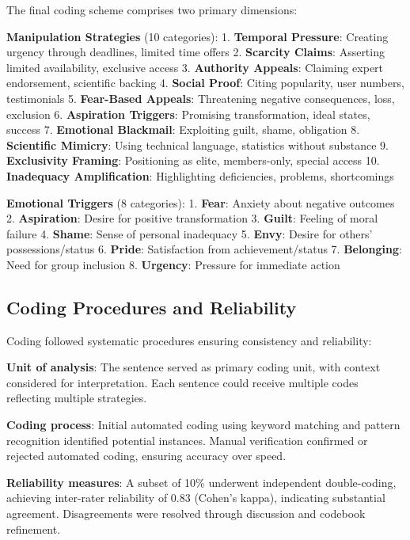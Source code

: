 The final coding scheme comprises two primary dimensions:

\textbf{Manipulation Strategies} (10 categories):
1. \textbf{Temporal Pressure}: Creating urgency through deadlines, limited time offers
2. \textbf{Scarcity Claims}: Asserting limited availability, exclusive access
3. \textbf{Authority Appeals}: Claiming expert endorsement, scientific backing
4. \textbf{Social Proof}: Citing popularity, user numbers, testimonials
5. \textbf{Fear-Based Appeals}: Threatening negative consequences, loss, exclusion
6. \textbf{Aspiration Triggers}: Promising transformation, ideal states, success
7. \textbf{Emotional Blackmail}: Exploiting guilt, shame, obligation
8. \textbf{Scientific Mimicry}: Using technical language, statistics without substance
9. \textbf{Exclusivity Framing}: Positioning as elite, members-only, special access
10. \textbf{Inadequacy Amplification}: Highlighting deficiencies, problems, shortcomings

\textbf{Emotional Triggers} (8 categories):
1. \textbf{Fear}: Anxiety about negative outcomes
2. \textbf{Aspiration}: Desire for positive transformation
3. \textbf{Guilt}: Feeling of moral failure
4. \textbf{Shame}: Sense of personal inadequacy
5. \textbf{Envy}: Desire for others' possessions/status
6. \textbf{Pride}: Satisfaction from achievement/status
7. \textbf{Belonging}: Need for group inclusion
8. \textbf{Urgency}: Pressure for immediate action

\subsection{Coding Procedures and Reliability}

Coding followed systematic procedures ensuring consistency and reliability:

\textbf{Unit of analysis}: The sentence served as primary coding unit, with context considered for interpretation. Each sentence could receive multiple codes reflecting multiple strategies.

\textbf{Coding process}: Initial automated coding using keyword matching and pattern recognition identified potential instances. Manual verification confirmed or rejected automated coding, ensuring accuracy over speed.

\textbf{Reliability measures}: A subset of 10\% underwent independent double-coding, achieving inter-rater reliability of 0.83 (Cohen's kappa), indicating substantial agreement. Disagreements were resolved through discussion and codebook refinement.

